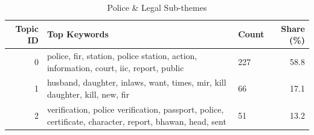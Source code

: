 \begin{table}[htbp]
\centering
\caption{Police \& Legal Sub-themes}
\label{tab:topics_Police_Legal}
\begin{tabular}{rlp{7cm}r}
\toprule
Topic ID & Top Keywords & Count & Share (\%) \\
\midrule
0 & police, fir, station, police station, action, information, court, iic, report, public & 227 & 58.8 \\
1 & husband, daughter, inlaws, want, times, mir, kill daughter, kill, new, fir & 66 & 17.1 \\
2 & verification, police verification, passport, police, certificate, character, report, bhawan, head, sent & 51 & 13.2 \\
\bottomrule
\end{tabular}
\end{table}